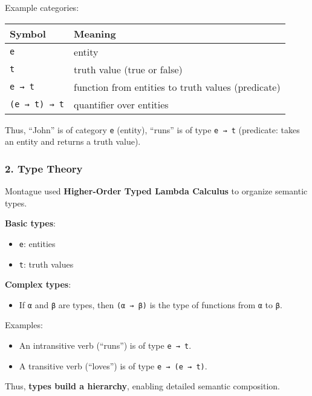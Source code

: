 \documentclass[12pt]{article}
\newcommand{\tightlist}{\itemsep 0pt\parskip 0pt\parsep 0pt}
\begin{document}
Example categories:

\begin{longtable}[]{@{}ll@{}}
\toprule
Symbol & Meaning \\
\midrule
\endhead
\texttt{e} & entity \\
\texttt{t} & truth value (true or false) \\
\texttt{e\ →\ t} & function from entities to truth values (predicate) \\
\texttt{(e\ →\ t)\ →\ t} & quantifier over entities \\
\bottomrule
\end{longtable}

Thus, ``John'' is of category \texttt{e} (entity), ``runs'' is of type
\texttt{e\ →\ t} (predicate: takes an entity and returns a truth value).

\hypertarget{type-theory}{%
\subsubsection{\texorpdfstring{2. \textbf{Type
Theory}}{2. Type Theory}}\label{type-theory}}

Montague used \textbf{Higher-Order Typed Lambda Calculus} to organize
semantic types.

\textbf{Basic types}:

\begin{itemize}
\tightlist
\item
  \texttt{e}: entities
\item
  \texttt{t}: truth values
\end{itemize}

\textbf{Complex types}:

\begin{itemize}
\tightlist
\item
  If \texttt{α} and \texttt{β} are types, then \texttt{(α\ →\ β)} is the
  type of functions from \texttt{α} to \texttt{β}.
\end{itemize}

Examples:

\begin{itemize}
\tightlist
\item
  An intransitive verb (``runs'') is of type \texttt{e\ →\ t}.
\item
  A transitive verb (``loves'') is of type \texttt{e\ →\ (e\ →\ t)}.
\end{itemize}

Thus, \textbf{types build a hierarchy}, enabling detailed semantic
composition.
\end{document}
